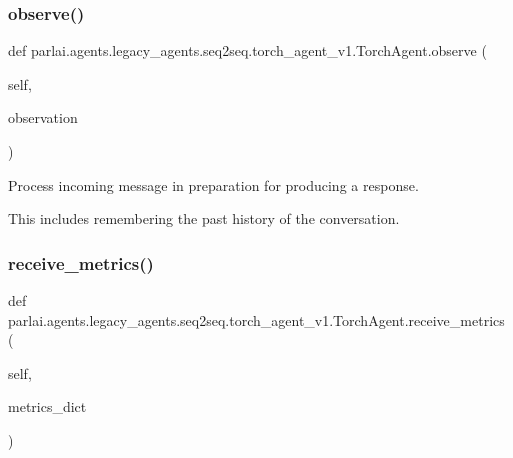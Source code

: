 \subsubsection{\texorpdfstring{observe()}{observe()}}
{\footnotesize\ttfamily def parlai.\+agents.\+legacy\+\_\+agents.\+seq2seq.\+torch\+\_\+agent\+\_\+v1.\+Torch\+Agent.\+observe (\begin{DoxyParamCaption}\item[{}]{self,  }\item[{}]{observation }\end{DoxyParamCaption})}

\begin{DoxyVerb}Process incoming message in preparation for producing a response.

This includes remembering the past history of the conversation.
\end{DoxyVerb}
 \mbox{\label{classparlai_1_1agents_1_1legacy__agents_1_1seq2seq_1_1torch__agent__v1_1_1TorchAgent_af97699a6b03a17969830db378f09cac4}} 
\subsubsection{\texorpdfstring{receive\+\_\+metrics()}{receive\_metrics()}}
{\footnotesize\ttfamily def parlai.\+agents.\+legacy\+\_\+agents.\+seq2seq.\+torch\+\_\+agent\+\_\+v1.\+Torch\+Agent.\+receive\+\_\+metrics (\begin{DoxyParamCaption}\item[{}]{self,  }\item[{}]{metrics\+\_\+dict }\end{DoxyParamCaption})}

